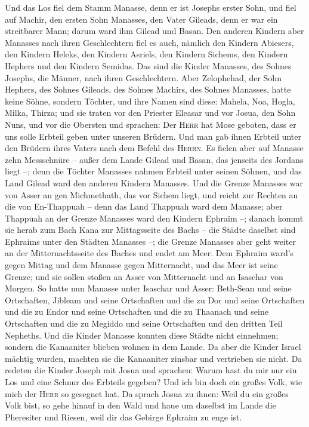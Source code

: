  Und das Los fiel dem Stamm Manasse, denn er ist Josephs
erster Sohn, und fiel auf Machir, den ersten Sohn Manasses, den Vater
Gileads, denn er war ein streitbarer Mann; darum ward ihm Gilead und
Basan.  Den anderen Kindern aber Manasses nach ihren
Geschlechtern fiel es auch, nämlich den Kindern Abiesers, den Kindern
Heleks, den Kindern Asriels, den Kindern Sichems, den Kindern Hephers
und den Kindern Semidas. Das sind die Kinder Manasses, des Sohnes
Josephs, die Männer, nach ihren Geschlechtern.  Aber
Zelophehad, der Sohn Hephers, des Sohnes Gileads, des Sohnes Machirs,
des Sohnes Manasses, hatte keine Söhne, sondern Töchter, und ihre Namen
sind diese: Mahela, Noa, Hogla, Milka, Thirza;  und sie
traten vor den Priester Eleasar und vor Josua, den Sohn Nuns, und vor
die Obersten und sprachen: Der \textsc{Herr} hat Mose geboten, dass er
uns solle Erbteil geben unter unseren Brüdern. Und man gab ihnen Erbteil
unter den Brüdern ihres Vaters nach dem Befehl des \textsc{Herrn}.
 Es fielen aber auf Manasse zehn Messschnüre -- außer dem
Lande Gilead und Basan, das jenseits des Jordans liegt --;
 denn die Töchter Manasses nahmen Erbteil unter seinen
Söhnen, und das Land Gilead ward den anderen Kindern Manasses.
 Und die Grenze Manasses war von Asser an gen Michmethath,
das vor Sichem liegt, und reicht zur Rechten an die von En-Thappuah --
 denn das Land Thappuah ward dem Manasse; aber Thappuah an
der Grenze Manasses ward den Kindern Ephraim --;  danach
kommt sie herab zum Bach Kana zur Mittagsseite des Bachs -- die Städte
daselbst sind Ephraims unter den Städten Manasses --; die Grenze
Manasses aber geht weiter an der Mitternachtsseite des Baches und endet
am Meer.  Dem Ephraim ward's gegen Mittag und dem Manasse
gegen Mitternacht, und das Meer ist seine Grenze; und sie sollen stoßen
an Asser von Mitternacht und an Isaschar von Morgen.  So
hatte nun Manasse unter Isaschar und Asser: Beth-Sean und seine
Ortschaften, Jibleam und seine Ortschaften und die zu Dor und seine
Ortschaften und die zu Endor und seine Ortschaften und die zu Thaanach
und seine Ortschaften und die zu Megiddo und seine Ortschaften und den
dritten Teil Nepheths.  Und die Kinder Manasse konnten
diese Städte nicht einnehmen; sondern die Kanaaniter blieben wohnen in
dem Lande.  Da aber die Kinder Israel mächtig wurden,
machten sie die Kanaaniter zinsbar und vertrieben sie nicht.
 Da redeten die Kinder Joseph mit Josua und sprachen:
Warum hast du mir nur ein Los und eine Schnur des Erbteils gegeben? Und
ich bin doch ein großes Volk, wie mich der \textsc{Herr} so gesegnet
hat.  Da sprach Josua zu ihnen: Weil du ein großes Volk
bist, so gehe hinauf in den Wald und haue um daselbst im Lande die
Pheresiter und Riesen, weil dir das Gebirge Ephraim zu enge ist.


